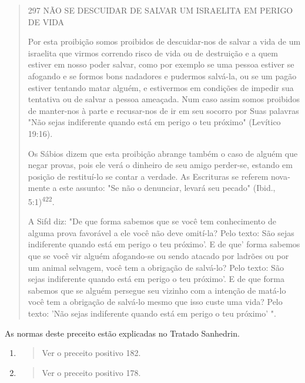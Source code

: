 \begin{quote}
297 NÃO SE DESCUIDAR DE SALVAR UM ISRAELITA EM PERIGO DE VIDA

Por esta proibição somos proibidos de descuidar-nos de salvar a vi­da de
um israelita que virmos correndo risco de vida ou de destruição e a quem
estiver em nosso poder salvar, como por exemplo se uma pessoa estiver se
afo­gando e se formos bons nadadores e pudermos salvá-la, ou se um pagão
estiver tentando matar alguém, e estivermos em condições de impedir sua
tentativa ou de salvar a pessoa ameaçada. Num caso assim somos proibidos
de manter-nos à parte e recusar-nos de ir em seu socorro por Suas
palavras "Não sejas in­diferente quando está em perigo o teu próximo"
(Levítico 19:16).

Os Sábios dizem que esta proibição abrange também o caso de al­guém que
negar provas, pois ele verá o dinheiro de seu amigo perder-se, estan­do
em posição de restituí-lo se contar a verdade. As Escrituras se referem
nova­mente a este assunto: "Se não o denunciar, levará seu pecado"
(Ibid., 5:1)\textsuperscript{422}.

A Sifd diz: "De que forma sabemos que se você tem conhecimento de alguma
prova favorável a ele você não deve omití-la? Pelo texto: São sejas
indiferente quando está em perigo o teu próximo'. E de que' forma
sabemos que se você vir alguém afogando-se ou sendo atacado por ladrões
ou por um animal selvagem, você tem a obrigação de salvá-lo? Pelo texto:
São sejas indi­ferente quando está em perigo o teu próximo'. E de que
forma sabemos que se alguém persegue seu vizinho com a intenção de
matá-lo você tem a obriga­ção de salvá-lo mesmo que isso custe uma vida?
Pelo texto: 'Não sejas indife­rente quando está em perigo o teu próximo'
".
\end{quote}

As normas deste preceito estão explicadas no Tratado Sanhedrin.

\begin{enumerate}
\def\labelenumi{\arabic{enumi}.}
\setcounter{enumi}{420}
\item
  \begin{quote}
  Ver o preceito positivo 182.
  \end{quote}
\item
  \begin{quote}
  Ver o preceito positivo 178.
  \end{quote}
\end{enumerate}

